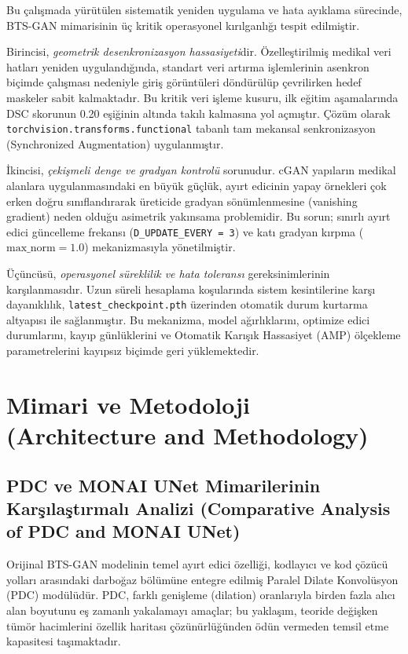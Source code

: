 \documentclass[10pt,journal,compsoc]{IEEEtran}
\begin{document}
Bu çalışmada yürütülen sistematik yeniden uygulama ve hata ayıklama sürecinde, BTS-GAN mimarisinin üç kritik operasyonel kırılganlığı tespit edilmiştir.

Birincisi, \textit{geometrik desenkronizasyon hassasiyeti}dir. Özelleştirilmiş medikal veri hatları yeniden uygulandığında, standart veri artırma işlemlerinin asenkron biçimde çalışması nedeniyle giriş görüntüleri döndürülüp çevrilirken hedef maskeler sabit kalmaktadır. Bu kritik veri işleme kusuru, ilk eğitim aşamalarında DSC skorunun 0.20 eşiğinin altında takılı kalmasına yol açmıştır. Çözüm olarak \texttt{torchvision.transforms.functional} tabanlı tam mekansal senkronizasyon (Synchronized Augmentation) uygulanmıştır.

İkincisi, \textit{çekişmeli denge ve gradyan kontrolü} sorunudur. cGAN yapıların medikal alanlara uygulanmasındaki en büyük güçlük, ayırt edicinin yapay örnekleri çok erken doğru sınıflandırarak üreticide gradyan sönümlenmesine (vanishing gradient) neden olduğu asimetrik yakınsama problemidir. Bu sorun; sınırlı ayırt edici güncelleme frekansı (\texttt{D\_UPDATE\_EVERY = 3}) ve katı gradyan kırpma ($\text{max\_norm}=1.0$) mekanizmasıyla yönetilmiştir.

Üçüncüsü, \textit{operasyonel süreklilik ve hata toleransı} gereksinimlerinin karşılanmasıdır. Uzun süreli hesaplama koşularında sistem kesintilerine karşı dayanıklılık, \texttt{latest\_checkpoint.pth} üzerinden otomatik durum kurtarma altyapısı ile sağlanmıştır. Bu mekanizma, model ağırlıklarını, optimize edici durumlarını, kayıp günlüklerini ve Otomatik Karışık Hassasiyet (AMP) ölçekleme parametrelerini kayıpsız biçimde geri yüklemektedir.

\section{Mimari ve Metodoloji \textnormal{\small{(Architecture and Methodology)}}}

\subsection{PDC ve MONAI UNet Mimarilerinin Karşılaştırmalı Analizi \textnormal{\small{(Comparative Analysis of PDC and MONAI UNet)}}}\label{sec:comparison}

Orijinal BTS-GAN modelinin temel ayırt edici özelliği, kodlayıcı ve kod çözücü yolları arasındaki darboğaz bölümüne entegre edilmiş Paralel Dilate Konvolüsyon (PDC) modülüdür. PDC, farklı genişleme (dilation) oranlarıyla birden fazla alıcı alan boyutunu eş zamanlı yakalamayı amaçlar; bu yaklaşım, teoride değişken tümör hacimlerini özellik haritası çözünürlüğünden ödün vermeden temsil etme kapasitesi taşımaktadır.
\end{document}
